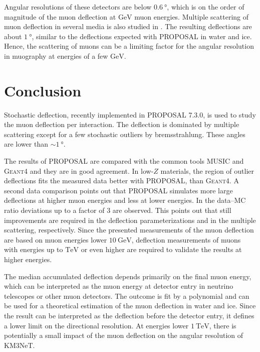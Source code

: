 Angular resolutions of these detectors are below $\SI{0.6}{\degree}$, which 
is on the order of magnitude of the muon deflection at $\si{\giga\electronvolt}$
muon energies. Multiple scattering of muon deflection in several media is 
also studied in \cite{muography_2019, Geant4_scattering}. The resulting 
deflections are about $\SI{1}{\degree}$, similar to the deflections 
expected with PROPOSAL in water and ice. Hence, the scattering 
of muons can be a limiting factor for the angular resolution in 
muography at energies of a few $\si{\giga\electronvolt}$.

\section{Conclusion}\label{sec:conclusion}

Stochastic deflection, recently implemented in PROPOSAL 7.3.0, is 
used to study the muon deflection per interaction. The deflection 
is dominated by multiple scattering except for a few stochastic 
outliers by bremsstrahlung. These angles are lower than
$\sim\SI{1}{\degree}$. 

The results of PROPOSAL are compared with the common tools MUSIC and 
\textsc{Geant4} and they are in good agreement. In low-$Z$ materials, the region of outlier 
deflections fits the measured data better with PROPOSAL, than \textsc{Geant4}. 
A second data comparison points out that PROPOSAL simulates more 
large deflections at higher muon energies and less at lower 
energies. 
In the data--MC ratio deviations up 
to a factor of $3$ are observed. 
This points out that still improvements are required in the deflection 
parameterizations and 
in the multiple scattering, respectively.
Since the presented measurements of the muon deflection are based on muon energies 
lower $\SI{10}{\giga\electronvolt}$, deflection measurements of muons with energies 
up to $\si{\tera\electronvolt}$ or even higher are required to validate the 
results at higher energies.

The median accumulated deflection depends primarily on the final muon energy, which can be interpreted as the muon energy at detector entry 
in neutrino telescopes or other muon detectors.
The outcome is fit by a polynomial and can be used for 
a theoretical estimation of the muon deflection in water and ice.
Since the result can be interpreted as the deflection before the detector entry, it defines a lower limit on the directional resolution.
At energies lower $\SI{1}{\tera\electronvolt}$, there is potentially a small impact of the muon deflection on the angular 
resolution of KM3NeT.


